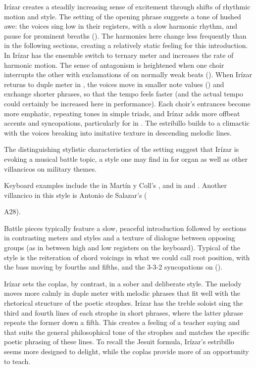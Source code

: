 Irízar creates a steadily increasing sense of excitement through shifts of rhythmic motion and style.
The setting of the opening phrase suggests a tone of hushed awe: the voices sing low in their registers, with a slow harmonic rhythm, and pause for prominent breaths ().
The harmonies here change less frequently than in the following sections, creating a relatively static feeling for this introduction.
In  Irízar has the ensemble switch to ternary meter and increases the rate of harmonic motion.
The sense of antagonism is heightened when one choir interrupts the other with exclamations of  on normally weak beats ().
When Irízar returns to duple meter in , the voices move in smaller note values () and exchange shorter phrases, so that the tempo feels faster (and the actual tempo could certainly be increased here in performance).
Each choir's entrances become more emphatic, repeating tones in simple triads, and Irízar adds more offbeat accents and syncopations, particularly for  in .
The estribillo builds to a climactic  with the voices breaking into imitative texture in descending melodic lines.

The distinguishing stylistic characteristics of the setting suggest that Irízar is evoking a musical battle topic, a style one may find in  for organ as well as other villancicos on military themes.%
\begin{Footnote}
    Keyboard examples include the  in Martín y Coll's \citXXX, and in  and .
    Another villancico in this style is Antonio de Salazar's  (\signature{MEX-Mc}{A28}).
\end{Footnote}
Battle pieces typically feature a slow, peaceful introduction followed by sections in contrasting meters and styles and a texture of dialogue between opposing groups (as in between high and low registers on the keyboard). 
Typical of the style is the reiteration of chord voicings in what we could call root position, with the bass moving by fourths and fifths, and the 3-3-2 syncopations on  ().

Irízar sets the coplas, by contrast, in a sober and deliberate style.
The melody moves more calmly in duple meter with melodic phrases that fit well with the rhetorical structure of the poetic strophes.
Irízar has the treble soloist sing the third and fourth lines of each strophe in short phrases, where the latter phrase repeats the former down a fifth.
This creates a feeling of a teacher saying  and  that suits the general philosophical tone of the strophes and matches the specific poetic phrasing of these lines.
To recall the Jesuit formula, Irízar's estribillo seems more designed to delight, while the coplas provide more of an opportunity to teach.

